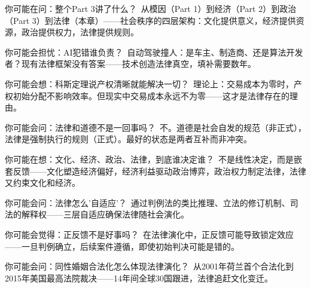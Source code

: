 \documentclass[a4paper,12pt]{book}
\newenvironment{motivation}{\begin{tcolorbox}[colback=gray!10,colframe=gray!60,title=\textit{本章动机},fonttitle=\bfseries,arc=0mm,leftrule=3mm]\small\itshape}{\end{tcolorbox}}
\begin{document}
\begin{motivation}
\begin{motivation}
\begin{motivation}
	\begin{tcolorbox}[colback=yellow!5, title=\textit{读者行为预测}]
		你可能在问：整个Part 3讲了什么？\ 从模因（Part 1）到经济（Part 2）到政治（Part 3）到法律（本章）——社会秩序的四层架构：文化提供意义，经济提供资源，政治提供权力，法律提供规则。
	\end{tcolorbox}


	\begin{tcolorbox}[colback=yellow!5, title=\textit{读者行为预测}]
		你可能会担忧：AI犯错谁负责？\ 自动驾驶撞人：是车主、制造商、还是算法开发者？现有法律框架没有答案——技术创造法律真空，填补需要数年。
	\end{tcolorbox}


	\begin{tcolorbox}[colback=yellow!5, title=\textit{读者行为预测}]
		你可能会想：科斯定理说产权清晰就能解决一切？\ 理论上：交易成本为零时，产权初始分配不影响效率。但现实中交易成本永远不为零——这才是法律存在的理由。
	\end{tcolorbox}


	\begin{tcolorbox}[colback=yellow!5, title=\textit{读者行为预测}]
		你可能会问：法律和道德不是一回事吗？\ 不。道德是社会自发的规范（非正式），法律是强制执行的规则（正式）。最好的状态是两者互补而非冲突。
	\end{tcolorbox}


	\begin{tcolorbox}[colback=yellow!5, title=\textit{读者行为预测}]
		你可能在想：文化、经济、政治、法律，到底谁决定谁？\ 不是线性决定，而是嵌套反馈——文化塑造经济偏好，经济利益驱动政治博弈，政治权力制定法律，法律又约束文化和经济。
	\end{tcolorbox}


	\begin{tcolorbox}[colback=yellow!5, title=\textit{读者行为预测}]
		你可能会问：法律怎么'自适应'？\ 通过判例法的类比推理、立法的修订机制、司法的解释权——三层自适应确保法律随社会演化。
	\end{tcolorbox}


	\begin{tcolorbox}[colback=yellow!5, title=\textit{读者行为预测}]
		你可能会觉得：正反馈不是好事吗？\ 在法律演化中，正反馈可能导致锁定效应——一旦判例确立，后续案件遵循，即使初始判决可能是错的。
	\end{tcolorbox}


	\begin{tcolorbox}[colback=yellow!5, title=\textit{读者行为预测}]
		你可能会问：同性婚姻合法化怎么体现法律演化？\ 从2001年荷兰首个合法化到2015年美国最高法院裁决——14年间全球30国跟进，法律追赶文化变迁。
	\end{tcolorbox}



\end{motivation}
\end{motivation}
\end{motivation}
\end{document}
